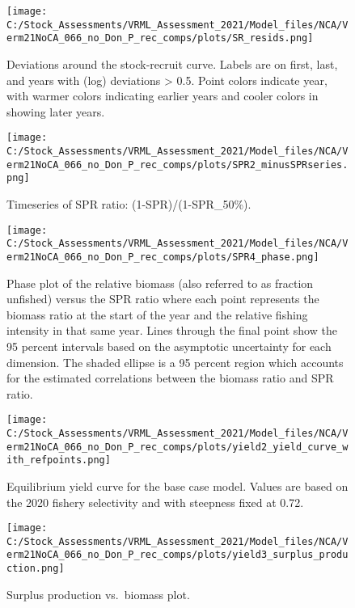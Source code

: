 \documentclass[11pt,
  english,
  a4paper,
]{article}
\begin{document}
\begin{figure}
\centering
\texttt{[image: C:/Stock\_Assessments/VRML\_Assessment\_2021/Model\_files/NCA/Verm21NoCA\_066\_no\_Don\_P\_rec\_comps/plots/SR\_resids.png]}
\caption{Deviations around the stock-recruit curve. Labels are on first, last, and years with (log) deviations \textgreater{} 0.5. Point colors indicate year, with warmer colors indicating earlier years and cooler colors in showing later years.\label{fig:bh-resids}}
\end{figure}

\begin{figure}
\centering
\texttt{[image: C:/Stock\_Assessments/VRML\_Assessment\_2021/Model\_files/NCA/Verm21NoCA\_066\_no\_Don\_P\_rec\_comps/plots/SPR2\_minusSPRseries.png]}
\caption{Timeseries of SPR ratio: (1-SPR)/(1-SPR\_50\%).\label{fig:1-spr}}
\end{figure}

\begin{figure}
\centering
\texttt{[image: C:/Stock\_Assessments/VRML\_Assessment\_2021/Model\_files/NCA/Verm21NoCA\_066\_no\_Don\_P\_rec\_comps/plots/SPR4\_phase.png]}
\caption{Phase plot of the relative biomass (also referred to as fraction unfished) versus the SPR ratio where each point represents the biomass ratio at the start of the year and the relative fishing intensity in that same year. Lines through the final point show the 95 percent intervals based on the asymptotic uncertainty for each dimension. The shaded ellipse is a 95 percent region which accounts for the estimated correlations between the biomass ratio and SPR ratio.\label{fig:phase}}
\end{figure}

\begin{figure}
\centering
\texttt{[image: C:/Stock\_Assessments/VRML\_Assessment\_2021/Model\_files/NCA/Verm21NoCA\_066\_no\_Don\_P\_rec\_comps/plots/yield2\_yield\_curve\_with\_refpoints.png]}
\caption{Equilibrium yield curve for the base case model. Values are based on the 2020 fishery selectivity and with steepness fixed at 0.72.\label{fig:yield2}}
\end{figure}

\begin{figure}
\centering
\texttt{[image: C:/Stock\_Assessments/VRML\_Assessment\_2021/Model\_files/NCA/Verm21NoCA\_066\_no\_Don\_P\_rec\_comps/plots/yield3\_surplus\_production.png]}
\caption{Surplus production vs.~biomass plot.\label{fig:yield3}}
\end{figure}
\end{document}
